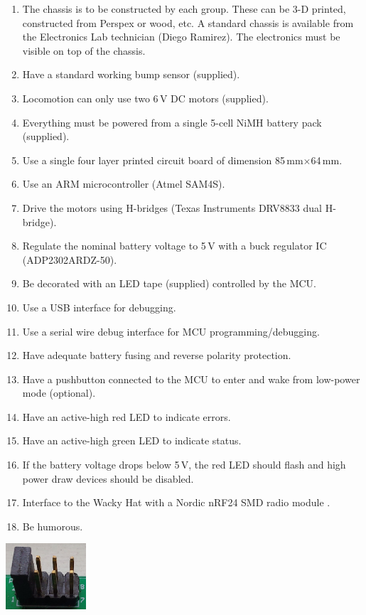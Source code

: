 \documentclass[11pt, a4paper]{article}
\begin{document}
\begin{enumerate}
\item The chassis is to be constructed by each group.  These can be 3-D printed,
  constructed from Perspex or wood, etc.  A standard chassis is available from
  the Electronics Lab technician (Diego Ramirez).  The electronics must be
  visible on top of the chassis.
\item Have a standard working bump sensor (supplied).
\item Locomotion can only use two 6\,V DC motors (supplied).
\item Everything must be powered from a single 5-cell NiMH battery pack (supplied).
\item Use a single four layer printed circuit board of dimension 85\,mm$\times$64\,mm.
\item Use an ARM microcontroller (Atmel SAM4S).
\item Drive the motors using H-bridges (Texas Instruments DRV8833 dual
  H-bridge).
\item Regulate the nominal battery voltage to 5\,V with a buck
  regulator IC (ADP2302ARDZ-50).
\item Be decorated with an LED tape (supplied) controlled by the MCU.
\item Use a USB interface for debugging.
\item Use a serial wire debug interface for MCU programming/debugging.
\item Have adequate battery fusing and reverse polarity protection.
\item Have a pushbutton connected to the MCU to enter and wake from
  low-power mode (optional).
\item Have an active-high red LED to indicate errors.
\item Have an active-high green LED to indicate status.
\item If the battery voltage drops below 5\,V, the red LED should flash and high power draw devices should be disabled.
\item Interface to the Wacky Hat with a Nordic nRF24 SMD radio module
.
\item Be humorous.
\end{enumerate}

\hspace{120mm}\includegraphics[width=3cm]{../guide/figs/jumpers4.jpg}
\end{document}
